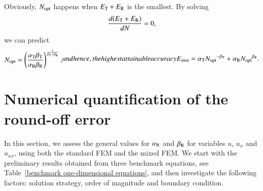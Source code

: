 \documentclass[review,3p]{elsarticle}
\begin{document}

Obviously, $N_{\rm opt}$ happens when $E_{\rm T}+E_{\rm R}$ is the smallest. By solving
\begin{equation}
    \frac{d(E_{\rm T}+E_{\rm R})}{dN}=0,    \label{derivative_condition_N_opt}
\end{equation}
we can predict
\begin{subequations}
\begin{align}
 N_{\rm opt} = \left( \frac{\alpha_{\rm T} \beta_{\rm T}}{\alpha _{\rm R} \beta_{\rm R}} \right)^{\frac{1}{\beta_{\rm T} + \beta_{\rm R}}},
\end{align}
and hence, the highest attainable accuracy
\begin{align}
 E_{\rm min} = \alpha_{\rm T} {N_{\rm opt}}^{- {\beta _{\rm T}}}+\alpha_{\rm R} {N_{\rm opt}}^{{\beta _{\rm R}}}.
\end{align}
\end{subequations}

\section{Numerical quantification of the round-off error}  	\label{section_numerical_results_sensitivity}

In this section, we assess the general values for $\alpha_{\rm R}$ and $\beta_{\rm R}$ for variables $u$, $u_x$ and $u_{xx}$, using both the standard FEM and the mixed FEM.
We start with the preliminary results obtained from three benchmark equations, see Table~\ref{benchmark one-dimensional equations}, and then investigate the following factors: solution strategy, order of magnitude and boundary condition. 
\end{document}
